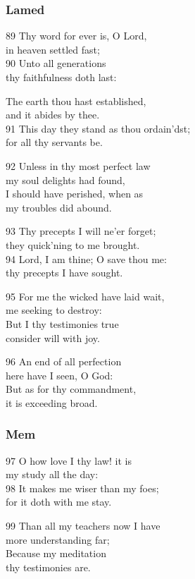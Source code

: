 \subsubsection*{Lamed}

89 Thy word for ever is, O Lord,\\
in heaven settled fast;\\
90 Unto all generations\\
thy faithfulness doth last:

The earth thou hast established,\\
and it abides by thee.\\
91 This day they stand as thou ordain’dst;\\
for all thy servants be.

92 Unless in thy most perfect law\\
my soul delights had found,\\
I should have perished, when as\\
my troubles did abound.

93 Thy precepts I will ne’er forget;\\
they quick’ning to me brought.\\
94 Lord, I am thine; O save thou me:\\
thy precepts I have sought.

95 For me the wicked have laid wait,\\
me seeking to destroy:\\
But I thy testimonies true\\
consider will with joy.

96 An end of all perfection\\
here have I seen, O God:\\
But as for thy commandment,\\
it is exceeding broad.

\subsubsection*{Mem}

97 O how love I thy law! it is\\
my study all the day:\\
98 It makes me wiser than my foes;\\
for it doth with me stay.

99 Than all my teachers now I have\\
more understanding far;\\
Because my meditation\\
thy testimonies are.


